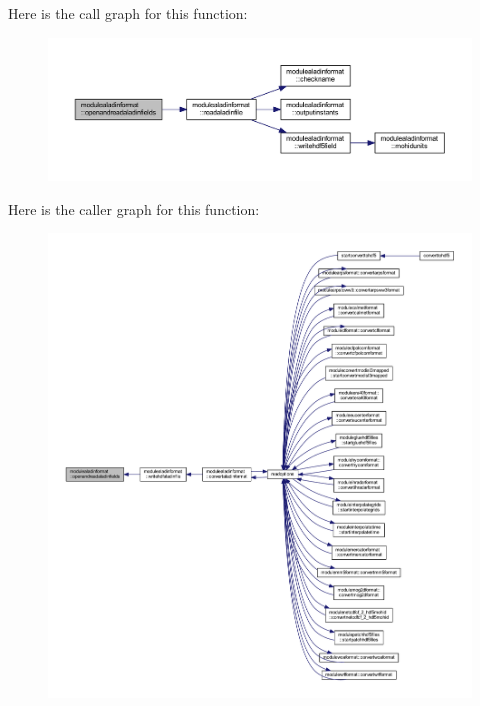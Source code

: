Here is the call graph for this function\+:\nopagebreak
\begin{figure}[H]
\begin{center}
\leavevmode
\includegraphics[width=350pt]{namespacemodulealadinformat_a2b65697a3c42c8dc546ebf63e260e98f_cgraph}
\end{center}
\end{figure}
Here is the caller graph for this function\+:\nopagebreak
\begin{figure}[H]
\begin{center}
\leavevmode
\includegraphics[width=350pt]{namespacemodulealadinformat_a2b65697a3c42c8dc546ebf63e260e98f_icgraph}
\end{center}
\end{figure}
\mbox{\label{namespacemodulealadinformat_a0340c1a27e19b5142e4089d2951da7cb}} 
